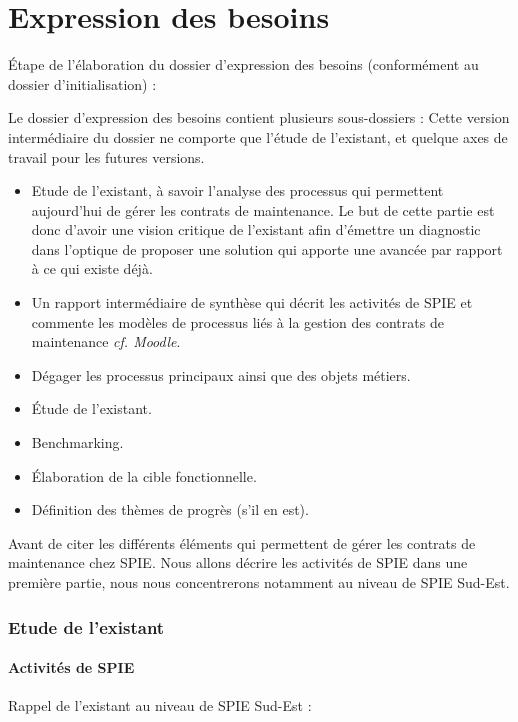 \part{Expression des besoins}

Étape de l’élaboration du dossier d'expression des besoins (conformément au dossier d’initialisation) : 

Le dossier d’expression des besoins contient plusieurs sous-dossiers : Cette version intermédiaire du dossier ne comporte que l’étude de l’existant, et quelque axes de travail pour les futures versions.



\begin{itemize}
\item Etude de l’existant, à savoir l’analyse des processus qui permettent aujourd’hui de gérer les contrats de maintenance. Le but de cette partie est donc d’avoir une vision critique de l’existant afin d’émettre un diagnostic dans l’optique de proposer une solution qui apporte une avancée par rapport à  ce qui existe déjà.
\item Un rapport intermédiaire de synthèse qui décrit les activités de SPIE et commente les modèles de processus liés à la gestion des contrats de maintenance \textit{cf. Moodle}.
\item Dégager les processus principaux ainsi que des objets métiers.
\item Étude de l’existant.
\item Benchmarking.
\item Élaboration de la cible fonctionnelle.
\item Définition des thèmes de progrès (s’il en est).
\end{itemize}

Avant de citer les différents éléments qui permettent de gérer les contrats de maintenance chez SPIE. Nous allons décrire les activités de SPIE dans une première partie, nous nous concentrerons notamment au niveau de SPIE Sud-Est.

\section{Etude de l'existant}

\subsection{Activités de SPIE}

Rappel de l’existant au niveau de SPIE Sud-Est :

